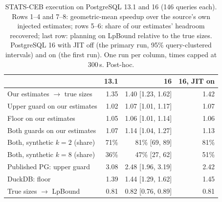 \documentclass[sigconf, nonacm]{acmart}
\begin{document}
\begin{table}[t]
\centering
\caption{STATS-CEB execution on PostgreSQL 13.1 and 16 (146 queries each).
Rows 1--4 and 7--8: geometric-mean speedup over the source's own injected
estimates; rows 5--6: share of our estimates' headroom recovered; last row:
planning on LpBound relative to the true sizes. PostgreSQL 16 with JIT off (the
primary run, 95\% query-clustered intervals) and on (the first run). One run
per column, times capped at 300\,s. Post-hoc.}
\label{tab:pg16}
\footnotesize
\setlength{\tabcolsep}{3pt}
\begin{tabular}{@{}lrrr@{}}
\toprule
 & 13.1 & 16 & 16, JIT on \\ \midrule
Our estimates $\to$ true sizes & 1.35 & 1.40 [1.23, 1.62] & 1.42 \\
Upper guard on our estimates & 1.02 & 1.07 [1.01, 1.17] & 1.07 \\
Floor on our estimates & 1.05 & 1.06 [1.01, 1.14] & 1.06 \\
Both guards on our estimates & 1.07 & 1.14 [1.04, 1.27] & 1.13 \\
Both, synthetic $k=2$ (share) & 71\% & 81\% [69, 89] & 81\% \\
Both, synthetic $k=8$ (share) & 36\% & 47\% [27, 62] & 51\% \\
Published PG: upper guard & 3.08 & 2.48 [1.96, 3.19] & 2.42 \\
DuckDB: floor & 1.39 & 1.44 [1.29, 1.62] & 1.45 \\
True sizes $\to$ LpBound & 0.81 & 0.82 [0.76, 0.89] & 0.81 \\
\bottomrule
\end{tabular}
\end{table}
\end{document}
